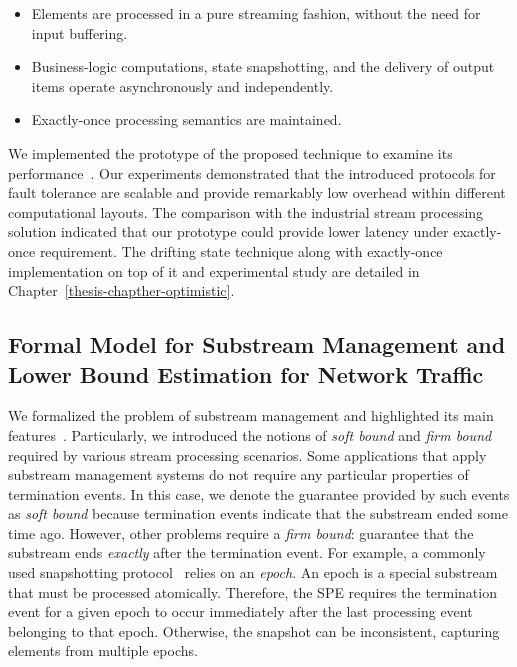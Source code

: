 \begin{itemize}
    \item Elements are processed in a pure streaming fashion, without the need for input buffering.
    \item Business-logic computations, state snapshotting, and the delivery of output items operate asynchronously and independently.
    \item Exactly-once processing semantics are maintained.
\end{itemize}

We implemented the prototype of the proposed technique to examine its performance~\cite{we2018adbis, we2018seim, thepaper}. Our experiments demonstrated that the introduced protocols for fault tolerance are scalable and provide remarkably low overhead within different computational layouts. The comparison with the industrial stream processing solution indicated that our prototype could provide lower latency under exactly-once requirement. The drifting state technique along with exactly-once implementation on top of it and experimental study are detailed in Chapter~\ref{thesis-chapther-optimistic}.

\subsection{Formal Model for Substream Management and Lower Bound Estimation for Network Traffic}

We formalized the problem of substream management and highlighted its main features~\cite{10.1145/3524860.3539809, trofimov2023bounding}. Particularly, we introduced the notions of {\em soft bound} and {\em firm bound} required by various stream processing scenarios. Some applications that apply substream management systems do not require any particular properties of termination events. In this case, we denote the guarantee provided by such events as {\em soft bound} because termination events indicate that the substream ended some time ago. However, other problems require a {\em firm bound}: guarantee that the substream ends {\em exactly} after the termination event. For example, a commonly used snapshotting protocol~\cite{2015arXiv150608603C, jacques2016consistent} relies on an {\em epoch}. An epoch is a special substream that must be processed atomically. Therefore, the SPE requires the termination event for a given epoch to occur immediately after the last processing event belonging to that epoch. Otherwise, the snapshot can be inconsistent, capturing elements from multiple epochs.

